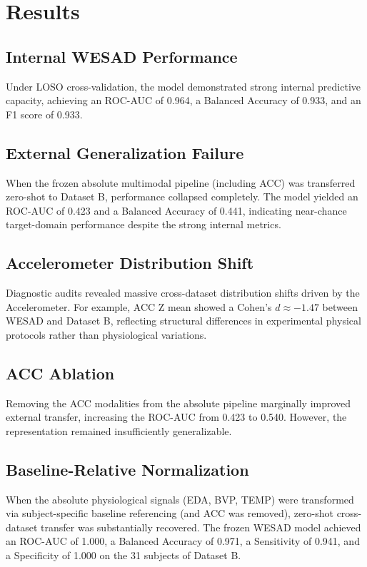 \documentclass[journal]{IEEEtran}
\begin{document}
\section{Results}

\subsection{Internal WESAD Performance}
Under LOSO cross-validation, the model demonstrated strong internal predictive capacity, achieving an ROC-AUC of 0.964, a Balanced Accuracy of 0.933, and an F1 score of 0.933.

\subsection{External Generalization Failure}
When the frozen absolute multimodal pipeline (including ACC) was transferred zero-shot to Dataset B, performance collapsed completely. The model yielded an ROC-AUC of 0.423 and a Balanced Accuracy of 0.441, indicating near-chance target-domain performance despite the strong internal metrics.

\subsection{Accelerometer Distribution Shift}
Diagnostic audits revealed massive cross-dataset distribution shifts driven by the Accelerometer. For example, ACC Z mean showed a Cohen’s $d \approx -1.47$ between WESAD and Dataset B, reflecting structural differences in experimental physical protocols rather than physiological variations.

\subsection{ACC Ablation}
Removing the ACC modalities from the absolute pipeline marginally improved external transfer, increasing the ROC-AUC from 0.423 to 0.540. However, the representation remained insufficiently generalizable.

\subsection{Baseline-Relative Normalization}
When the absolute physiological signals (EDA, BVP, TEMP) were transformed via subject-specific baseline referencing (and ACC was removed), zero-shot cross-dataset transfer was substantially recovered. The frozen WESAD model achieved an ROC-AUC of 1.000, a Balanced Accuracy of 0.971, a Sensitivity of 0.941, and a Specificity of 1.000 on the 31 subjects of Dataset B.
\end{document}
